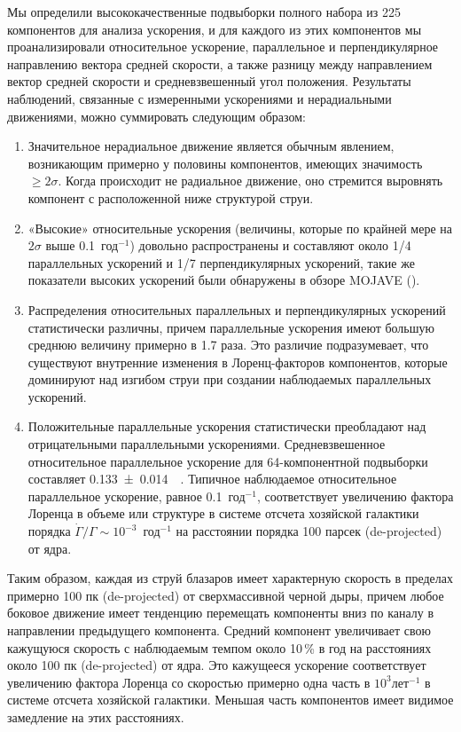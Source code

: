 Мы определили высококачественные подвыборки полного набора из 225 компонентов для анализа ускорения,
и для каждого из этих компонентов мы проанализировали относительное ускорение, параллельное и
перпендикулярное направлению вектора средней скорости, а также разницу между направлением вектор
средней скорости и средневзвешенный угол положения. Результаты наблюдений, связанные с измеренными
ускорениями и нерадиальными движениями, можно суммировать следующим образом:
\begin{enumerate}
 \item
 Значительное нерадиальное движение является обычным явлением, возникающим примерно у половины
компонентов, имеющих значимость $\ge2\sigma$. Когда происходит не радиальное движение, оно
стремится выровнять компонент с расположенной ниже структурой струи.

\item
«Высокие» относительные ускорения (величины, которые по крайней мере на $2\sigma$ выше
0.1~год$^{-1}$) довольно распространены и составляют около 1/4 параллельных ускорений и 1/7
перпендикулярных ускорений, такие же показатели высоких ускорений были обнаружены в обзоре MOJAVE
(\cite{Homan_2009}).

\item
Распределения относительных параллельных и перпендикулярных ускорений статистически различны, причем
параллельные ускорения имеют большую среднюю величину примерно в 1.7 раза. Это различие
подразумевает, что существуют внутренние изменения в Лоренц-факторов компонентов, которые
доминируют над изгибом струи при создании наблюдаемых параллельных ускорений.

\item
Положительные параллельные ускорения статистически преобладают над отрицательными параллельными
ускорениями. Средневзвешенное относительное параллельное ускорение для 64-компонентной подвыборки
составляет \SI{0.133+-0.014}{\per\year}. Типичное наблюдаемое относительное параллельное
ускорение, равное 0.1~год$^{-1}$, соответствует увеличению фактора Лоренца в объеме или
структуре в системе отсчета хозяйской галактики порядка $\dot{\Gamma} / \Gamma
\sim10^{-3}$~год$^{-1}$ на расстоянии порядка 100 парсек (de-projected) от ядра.

\end{enumerate}

Таким образом, каждая из струй блазаров имеет характерную скорость в пределах примерно 100 пк
(de-projected) от сверхмассивной черной дыры, причем любое боковое движение имеет тенденцию
перемещать компоненты вниз по каналу в направлении предыдущего компонента. Средний компонент
увеличивает свою кажущуюся скорость с наблюдаемым темпом около 10\,\% в год на расстояниях около
100 пк (de-projected) от ядра. Это кажущееся ускорение соответствует увеличению фактора Лоренца
со скоростью примерно одна часть в $10^3$лет$^{-1}$ в системе отсчета хозяйской галактики. Меньшая
часть компонентов имеет видимое замедление на этих расстояниях.

